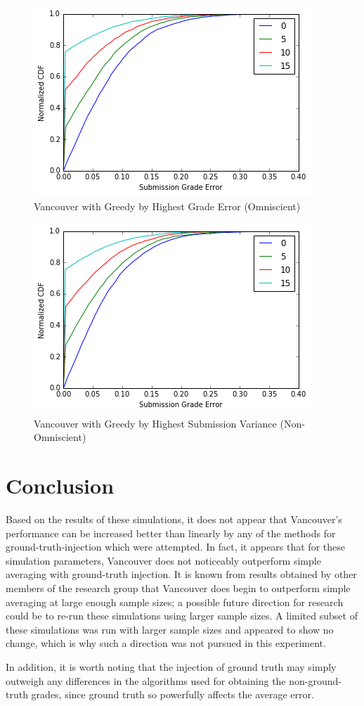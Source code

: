 \documentclass{article}
\begin{document}
	\begin{figure}[h]
		\includegraphics{vancouver-highest-grade-error}
		\caption{Vancouver with Greedy by Highest Grade Error (Omniscient)}
	\end{figure}
	
	\begin{figure}[h]
		\includegraphics{vancouver-highest-submission-variance}
		\caption{Vancouver with Greedy by Highest Submission Variance (Non-Omniscient)}
	\end{figure}
	
	
	\section{Conclusion}
	Based on the results of these simulations, it does not appear that Vancouver's performance can be increased better than linearly by any of the methods for ground-truth-injection which were attempted. In fact, it appears that for these simulation parameters, Vancouver does not noticeably outperform simple averaging with ground-truth injection. It is known from results obtained by other members of the research group that Vancouver does begin to outperform simple averaging at large enough sample sizes; a possible future direction for research could be to re-run these simulations using larger sample sizes. A limited subset of these simulations was run with larger sample sizes and appeared to show no change, which is why such a direction was not pursued in this experiment. 
	
	In addition, it is worth noting that the injection of ground truth may simply outweigh any differences in the algorithms used for obtaining the non-ground-truth grades, since ground truth so powerfully affects the average error.
	
\end{document}
